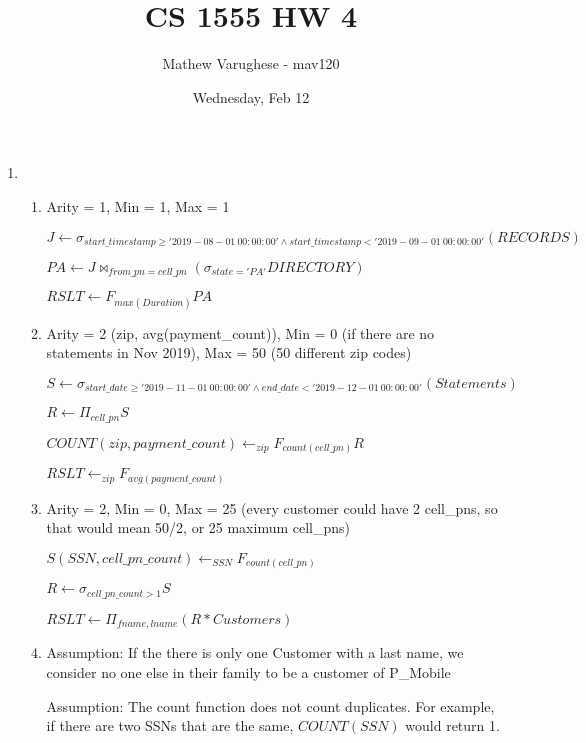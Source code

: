 \documentclass[12pt]{article}
\begin{document}
\title{CS 1555 HW 4}
\author{Mathew Varughese - mav120} 
\date{Wednesday, Feb 12}

\maketitle

\begin{enumerate}

\item %

\begin{enumerate}

\item %

Arity = 1, Min = 1, Max = 1

$ J \leftarrow \sigma_{start\_timestamp \geq '2019-08-01 \ 00:00:00' \land start\_timestamp < '2019-09-01 \ 00:00:00' } (RECORDS) $

$ PA \leftarrow J \bowtie_{from\_pn = cell\_pn} (\sigma_{state='PA'} DIRECTORY) $

$ RSLT \leftarrow F_{max(Duration)} PA $

\item %
Arity = 2 (zip, avg(payment\_count)), Min = 0 (if there are no statements in Nov 2019), Max = 50 (50 different zip codes)

$ S \leftarrow \sigma_{start\_date \geq '2019-11-01 \ 00:00:00' \land end\_date < '2019-12-01 \ 00:00:00' } (Statements) $

$ R \leftarrow \Pi_{cell\_pn} S$

$ COUNT(zip, payment\_count) \leftarrow _{zip}F_{count(cell\_pn)} R $

$ RSLT \leftarrow _{zip}F_{avg(payment\_count)} $

\item %
Arity = 2, Min = 0, Max = 25 (every customer could have 2 cell\_pns, so that 
would mean 50/2, or 25 maximum cell\_pns)

$ S(SSN, cell\_pn\_count) \leftarrow _{SSN}F_{count(cell\_pn)} $

$ R \leftarrow \sigma_{cell\_pn\_count > 1} S $

$ RSLT \leftarrow \Pi_{fname, lname} (R * Customers) $

\item %
Assumption: If the there is only one Customer with a last name, we consider
no one else in their family to be a customer of P\_Mobile

Assumption: The count function does not count duplicates. For example, if there 
are two SSNs that are the same, $COUNT(SSN)$ would return 1. 


\end{enumerate}
\end{enumerate}
\end{document}
